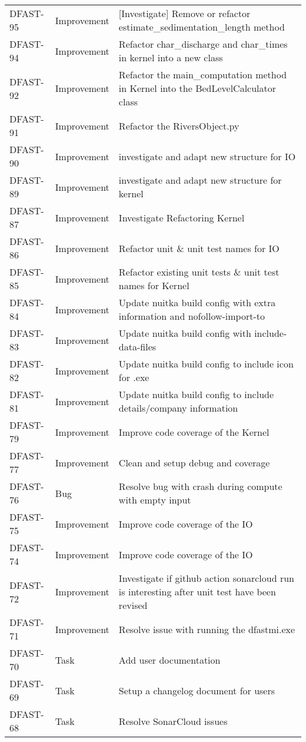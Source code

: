 \documentclass[git]{deltares_manual}
\begin{document}
\begin{longtable}{l|l|p{8cm}}
DFAST-95 & Improvement & [Investigate] Remove or refactor estimate\_sedimentation\_length method \\
DFAST-94 & Improvement & Refactor char\_discharge and char\_times in kernel into a new class \\
DFAST-92 & Improvement & Refactor the main\_computation method in Kernel into the BedLevelCalculator class \\
DFAST-91 & Improvement & Refactor the RiversObject.py \\
DFAST-90 & Improvement & investigate and adapt new structure for IO \\
DFAST-89 & Improvement & investigate and adapt new structure for kernel \\
DFAST-87 & Improvement & Investigate Refactoring Kernel \\
DFAST-86 & Improvement & Refactor unit \& unit test names for IO \\
DFAST-85 & Improvement & Refactor existing unit tests \& unit test names for Kernel \\
DFAST-84 & Improvement & Update nuitka build config with extra information and nofollow-import-to \\
DFAST-83 & Improvement & Update nuitka build config with include-data-files \\
DFAST-82 & Improvement & Update nuitka build config to include icon for .exe \\
DFAST-81 & Improvement & Update nuitka build config to include details/company information \\
DFAST-79 & Improvement & Improve code coverage of the Kernel  \\
DFAST-77 & Improvement & Clean and setup debug and coverage \\
DFAST-76 & Bug & Resolve bug with crash during compute with empty input \\
DFAST-75 & Improvement & Improve code coverage of the IO \\
DFAST-74 & Improvement & Improve code coverage of the IO  \\
DFAST-72 & Improvement & Investigate if github action sonarcloud run is interesting after unit test have been revised \\
DFAST-71 & Improvement & Resolve issue with running the dfastmi.exe \\
DFAST-70 & Task & Add user documentation \\
DFAST-69 & Task & Setup a changelog document for users \\
DFAST-68 & Task & Resolve SonarCloud issues \\

\end{longtable}
\end{document}

